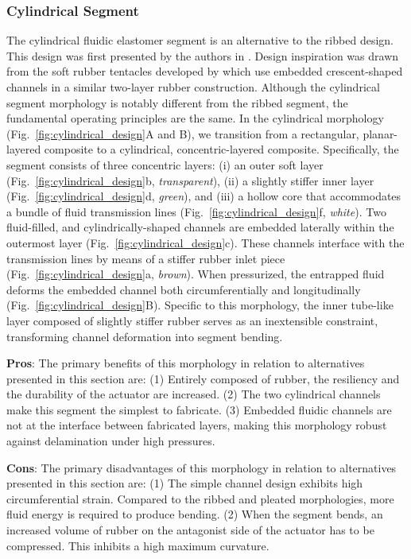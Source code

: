 \subsubsection{Cylindrical Segment}
\label{subsubsec:Actuators, Actuator Morphologies, Cylindrical}
The cylindrical fluidic elastomer segment is an alternative to the ribbed design.
%
This design was first presented by the authors in \citet{marchese2014whole}.
%
Design inspiration was drawn from the soft rubber tentacles developed by \citet{martinez2013robotic} which use embedded crescent-shaped channels in a similar two-layer rubber construction.
%
Although the cylindrical segment morphology is notably different from the ribbed segment, the fundamental operating principles are the same.
%
In the cylindrical morphology (Fig.~\ref{fig:cylindrical_design}A and B), we transition from a rectangular, planar-layered composite to a cylindrical, concentric-layered composite.
%
Specifically, the segment consists of three concentric layers: (i) an outer soft layer (Fig.~\ref{fig:cylindrical_design}b, \emph{transparent}), (ii) a slightly stiffer inner layer (Fig.~\ref{fig:cylindrical_design}d, \emph{green}), and (iii) a hollow core that accommodates a bundle of fluid transmission lines (Fig.~\ref{fig:cylindrical_design}f, \emph{white}).
%
Two fluid-filled, and cylindrically-shaped channels are embedded laterally within the outermost layer (Fig.~\ref{fig:cylindrical_design}c).
%
These channels interface with the transmission lines by means of a stiffer rubber inlet piece (Fig.~\ref{fig:cylindrical_design}a, \emph{brown}).
%
When pressurized, the entrapped fluid deforms the embedded channel both circumferentially and longitudinally (Fig.~\ref{fig:cylindrical_design}B).
%
Specific to this morphology, the inner tube-like layer composed of slightly stiffer rubber serves as an inextensible constraint, transforming channel deformation into segment bending.


\textbf{Pros}: The primary benefits of this morphology in relation to alternatives presented in this section are: (1) Entirely composed of rubber, the resiliency and the durability of the actuator are increased. (2) The two cylindrical channels make this segment the simplest to fabricate. (3) Embedded fluidic channels are not at the interface between fabricated layers, making this morphology robust against delamination under high pressures.

\textbf{Cons}: The primary disadvantages of this morphology in relation to alternatives presented in this section are: (1) The simple channel design exhibits high circumferential strain. Compared to the ribbed and pleated morphologies, more fluid energy is required to produce bending. (2) When the segment bends, an increased volume of rubber on the antagonist side of the actuator has to be compressed. This inhibits a high maximum curvature.

